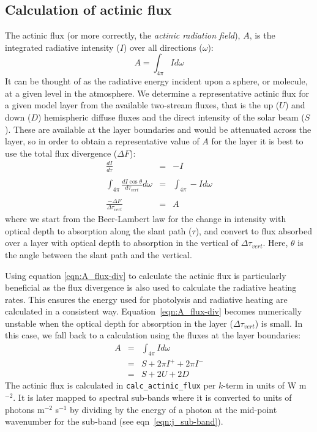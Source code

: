 \subsection{Calculation of actinic flux}
The actinic flux (or more correctly, the {\em actinic radiation field}), $A$, is the integrated radiative intensity ($I$) over all directions ($\omega$):
\begin{equation}
A = \int_{4\pi}I d\omega
\end{equation}
It can be thought of as the radiative energy incident upon a sphere, or molecule, at a given level in the atmosphere. We determine a representative actinic flux for a given model layer from the available two-stream fluxes, that is the up ($U$) and down ($D$) hemispheric diffuse fluxes and the direct intensity of the solar beam ($S$). These are available at the layer boundaries and would be attenuated across the layer, so in order to obtain a representative value of $A$ for the layer it is best to use the total flux divergence ($\Delta F$):
\begin{eqnarray}
\frac{dI}{d\tau} & = & -I \\
&& \nonumber \\
\int_{4\pi}\frac{dI \cos{\theta}}{d\tau_{vert}}d\omega & = & \int_{4\pi}-I d\omega \\
&& \nonumber \\
\frac{-\Delta F}{\Delta \tau_{vert}} & = & A \label{eqn:A_flux-div}
\end{eqnarray}
where we start from the Beer-Lambert law for the change in intensity with optical depth to absorption along the slant path ($\tau$), and convert to flux absorbed over a layer with optical depth to absorption in the vertical of $\Delta \tau_{vert}$. Here, $\theta$ is the angle between the slant path and the vertical.

Using equation \ref{eqn:A_flux-div} to calculate the actinic flux is particularly beneficial as the flux divergence is also used to calculate the radiative heating rates. This ensures the energy used for photolysis and radiative heating are calculated in a consistent way. Equation~\ref{eqn:A_flux-div} becomes numerically unstable when the optical depth for absorption in the layer ($\Delta \tau_{vert}$) is small. In this case, we fall back to a calculation using the fluxes at the layer boundaries:
\begin{eqnarray}
A & = & \int_{4\pi}I d\omega \nonumber \\
  & = & S + 2 \pi I^+ + 2 \pi I^- \nonumber \\
  & = & S + 2 U + 2 D
\end{eqnarray}
The actinic flux is calculated in {\tt calc\_actinic\_flux} per $k$-term in units of W m$^{-2}$. It is later mapped to spectral sub-bands where it is converted
to units of photons m$^{-2}$ s$^{-1}$ by dividing by the energy of a photon at the mid-point wavenumber for the sub-band (see eqn~\ref{eqn:j_sub-band}).

